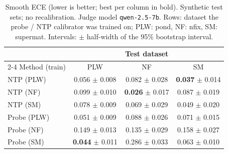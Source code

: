 \begin{table}[t]
\centering
\small
\caption{Smooth ECE (lower is better; best per column in bold). Synthetic test sets; no recalibration. Judge model \texttt{qwen-2.5-7b}. Rows: dataset the probe / NTP calibrator was trained on; PLW: pond, NF: nfix, SM: supermat. Intervals: $\pm$ half-width of the 95\% bootstrap interval.}
\label{tab:calibration-syn-smece}
\begin{tabular}{lccc}
\toprule
& \multicolumn{3}{c}{Test dataset} \\
\cmidrule(l){2-4}
Method (train) & PLW & NF & SM \\
\midrule
NTP (PLW) & 0.056 $\pm$ 0.008 & 0.082 $\pm$ 0.028 & \textbf{0.037} $\pm$ 0.014 \\
NTP (NF) & 0.099 $\pm$ 0.010 & \textbf{0.026} $\pm$ 0.017 & 0.087 $\pm$ 0.019 \\
NTP (SM) & 0.078 $\pm$ 0.009 & 0.069 $\pm$ 0.029 & 0.049 $\pm$ 0.020 \\
\midrule
Probe (PLW) & 0.051 $\pm$ 0.009 & 0.088 $\pm$ 0.026 & 0.071 $\pm$ 0.015 \\
Probe (NF) & 0.149 $\pm$ 0.013 & 0.135 $\pm$ 0.029 & 0.158 $\pm$ 0.027 \\
Probe (SM) & \textbf{0.044} $\pm$ 0.011 & 0.286 $\pm$ 0.033 & 0.063 $\pm$ 0.010 \\
\bottomrule
\end{tabular}
\end{table}

